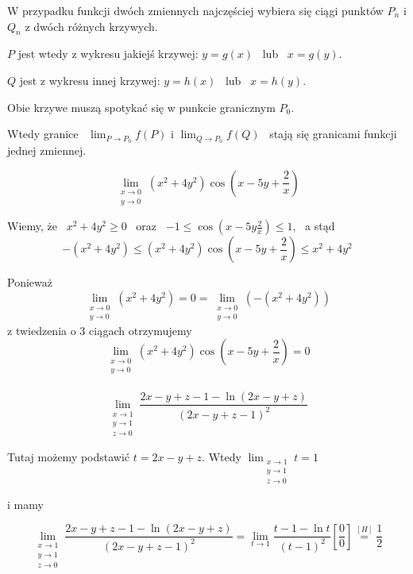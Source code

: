 W przypadku funkcji dwóch zmiennych najczęściej wybiera się ciągi punktów $P_n$ i $Q_n$ z dwóch różnych krzywych.

$P$ jest wtedy z wykresu jakiejś krzywej: $ y=g(x)$ \ lub \ $x=g(y)$.

$Q$ jest z wykresu innej krzywej: $y=h(x)$ \ lub \ $x=h(y)$.

Obie krzywe muszą spotykać się w punkcie granicznym $P_0$.

Wtedy granice \ $ \lim_{P \to P_0} f(P) $ \quad i \quad $ \lim_{Q \to P_0} f(Q) $ \ stają się granicami funkcji jednej zmiennej. \\

\begin{przyklad}

$$ \lim_{\substack{x \to 0 \\ y \to 0}} (x^2 + 4y^2) \cos \left( x - 5y + \frac{2}{x} \right) $$

Wiemy, że \ $ x^2 + 4y^2 \geq 0 $ \ oraz \ $ -1 \leq \cos \left( x - 5y \frac{2}{x} \right) \leq 1 $, \ a stąd
$$ -(x^2 + 4y^2) \leq (x^2 + 4y^2) \cos \left( x - 5y + \frac{2}{x} \right) \leq x^2 + 4y^2 $$

Ponieważ 
$$ \lim_{\substack{x \to 0 \\ y \to 0}} (x^2 + 4y^2) = 0 = \lim_{\substack{x \to 0 \\ y \to 0}} (-(x^2 + 4y^2)) $$
z twiedzenia o 3 ciągach otrzymujemy
$$ \lim_{\substack{x \to 0 \\ y \to 0}} (x^2 + 4y^2) \cos \left( x - 5y + \frac{2}{x} \right) = 0 $$ \\

$$ \lim_{\substack{x \to 1 \\ y \to 1 \\ z \to 0}} \frac{2x - y + z - 1 - \ln(2x - y + z)}{(2x - y + z - 1)^2} $$

Tutaj możemy podstawić $ t = 2x - y + z $. Wtedy $ \lim_{\substack{x \to 1 \\ y \to 1 \\ z \to 0}} t = 1 $

i mamy

$$ \lim_{\substack{x \to 1 \\ y \to 1 \\ z \to 0}} \frac{2x - y + z - 1 - \ln(2x - y + z)}{(2x - y + z - 1)^2}
= \lim_{t \to 1} \frac{t - 1 - \ln t}{(t-1)^2} \left[ \frac{0}{0} \right] \stackrel{[H]}{=} \frac{1}{2}$$
\end{przyklad}

